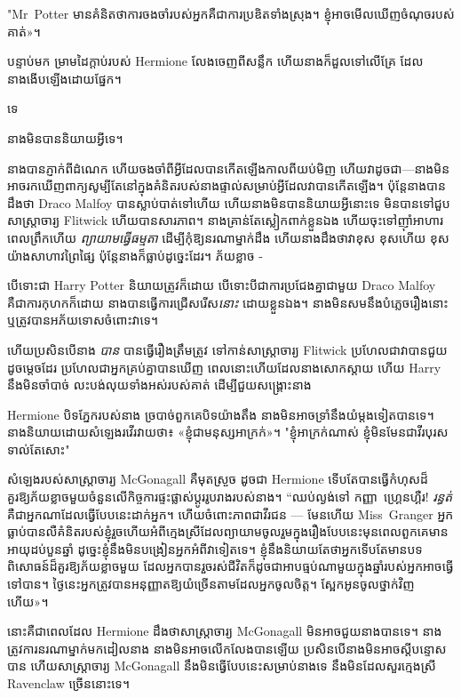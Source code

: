"Mr~Potter មានគំនិតថាការចងចាំរបស់អ្នកគឺជាការប្រឌិតទាំងស្រុង។ ខ្ញុំ​អាច​មើល​ឃើញ​ចំណុច​របស់​គាត់»។

បន្ទាប់មក ម្រាមដៃក្តាប់របស់ Hermione លែងចេញពីសន្លឹក ហើយនាងក៏ដួលទៅលើគ្រែ ដែលនាងងើបឡើងដោយផ្នែក។

ទេ

នាងមិនបាននិយាយអ្វីទេ។

នាង​បាន​ភ្ញាក់​ពី​ដំណេក ហើយ​ចងចាំ​ពី​អ្វី​ដែល​បាន​កើត​ឡើង​កាល​ពី​យប់​មិញ ហើយ​វា​ដូច​ជា—នាង​មិន​អាច​រក​ឃើញ​ពាក្យ​សូម្បី​តែ​នៅ​ក្នុង​គំនិត​របស់​នាង​ផ្ទាល់​សម្រាប់​អ្វី​ដែល​វា​បាន​កើត​ឡើង​។ ប៉ុន្តែ​នាង​បាន​ដឹង​ថា Draco Malfoy បាន​ស្លាប់​បាត់​ទៅ​ហើយ ហើយ​នាង​មិន​បាន​និយាយ​អ្វី​នោះ​ទេ មិន​បាន​ទៅ​ជួប​សាស្ត្រាចារ្យ Flitwick ហើយ​បាន​សារភាព។ នាងគ្រាន់តែស្លៀកពាក់ខ្លួនឯង ហើយចុះទៅញ៉ាំអាហារពេលព្រឹកហើយ \emph{ព្យាយាមធ្វើធម្មតា} ដើម្បីកុំឱ្យនរណាម្នាក់ដឹង ហើយនាងដឹងថាវាខុស ខុសហើយ ខុសយ៉ាងសាហាវព្រៃផ្សៃ ប៉ុន្តែនាងក៏ធ្លាប់ដូច្នេះដែរ។ ភ័យខ្លាច -

បើទោះជា Harry Potter និយាយត្រូវក៏ដោយ បើទោះបីជាការប្រជែងគ្នាជាមួយ Draco Malfoy គឺជាការកុហកក៏ដោយ នាងបានធ្វើការជ្រើសរើស\emph{នោះ} ដោយខ្លួនឯង។ នាង​មិន​សម​នឹង​បំភ្លេច​រឿង​នោះ ឬ​ត្រូវ​បាន​អភ័យទោស​ចំពោះ​វា​ទេ។

ហើយប្រសិនបើនាង \emph{បាន} បានធ្វើរឿងត្រឹមត្រូវ ទៅកាន់សាស្រ្តាចារ្យ Flitwick ប្រហែលជាវាបានជួយ ដូចម្ដេចដែរ ប្រហែលជាអ្នកគ្រប់គ្នាបានឃើញ ពេលនោះហើយដែលនាងសោកស្ដាយ ហើយ Harry នឹងមិនចាំបាច់ លះបង់លុយទាំងអស់របស់គាត់ ដើម្បីជួយសង្គ្រោះនាង

Hermione បិទភ្នែករបស់នាង ច្របាច់ពួកគេបិទយ៉ាងតឹង នាងមិនអាចទ្រាំនឹងយំម្តងទៀតបានទេ។ នាង​និយាយ​ដោយ​សំឡេង​រវើរវាយ​ថា​៖ «​ខ្ញុំ​ជា​មនុស្ស​អាក្រក់​»​។ "ខ្ញុំអាក្រក់ណាស់ ខ្ញុំមិនមែនជាវីរបុរសទាល់តែសោះ"

សំឡេងរបស់សាស្រ្តាចារ្យ McGonagall គឺមុតស្រួច ដូចជា Hermione ទើបតែបានធ្វើកំហុសដ៏គួរឱ្យភ័យខ្លាចមួយចំនួនលើកិច្ចការផ្ទះផ្លាស់ប្តូររូបរាងរបស់នាង។ “ឈប់ល្ងង់ទៅ កញ្ញា~ហ្គ្រេនហ្គឺរ! \emph{រន្ធត់} គឺជាអ្នកណាដែលធ្វើបែបនេះដាក់អ្នក។ ហើយចំពោះភាពជាវីរជន — មែនហើយ Miss~Granger អ្នកធ្លាប់បានលឺគំនិតរបស់ខ្ញុំរួចហើយអំពីក្មេងស្រីដែលព្យាយាមចូលរួមក្នុងរឿងបែបនេះមុនពេលពួកគេមានអាយុដប់បួនឆ្នាំ ដូច្នេះខ្ញុំនឹងមិនបង្រៀនអ្នកអំពីវាទៀតទេ។ ខ្ញុំនឹងនិយាយតែថាអ្នកទើបតែមានបទពិសោធន៍ដ៏គួរឱ្យភ័យខ្លាចមួយ ដែលអ្នកបានរួចរស់ជីវិតក៏ដូចជាអាបធ្មប់ណាមួយក្នុងឆ្នាំរបស់អ្នកអាចធ្វើទៅបាន។ ថ្ងៃនេះអ្នកត្រូវបានអនុញ្ញាតឱ្យយំច្រើនតាមដែលអ្នកចូលចិត្ត។ ស្អែក​អូន​ចូល​ថ្នាក់​វិញ​ហើយ»។

នោះគឺជាពេលដែល Hermione ដឹងថាសាស្រ្តាចារ្យ McGonagall មិនអាចជួយនាងបានទេ។ នាងត្រូវការនរណាម្នាក់មកដៀលនាង នាងមិនអាចលើកលែងបានឡើយ ប្រសិនបើនាងមិនអាចស្តីបន្ទោសបាន ហើយសាស្រ្តាចារ្យ McGonagall នឹងមិនធ្វើបែបនេះសម្រាប់នាងទេ នឹងមិនដែលសួរក្មេងស្រី Ravenclaw ច្រើននោះទេ។

